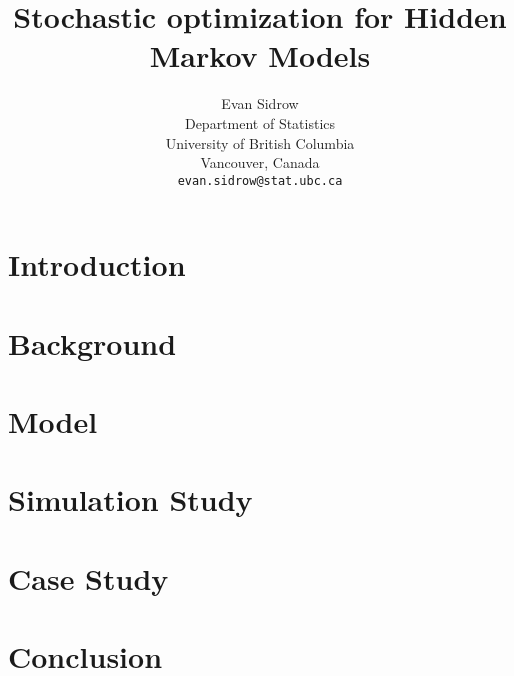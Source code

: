\documentclass{article}
\title{Stochastic optimization for Hidden Markov Models}
\author{
  Evan Sidrow \\
  Department of Statistics\\
  University of British Columbia\\
  Vancouver, Canada \\
  \texttt{evan.sidrow@stat.ubc.ca} \\
}
\begin{document}
\maketitle


\section{Introduction}
%

\section{Background}


\section{Model}


\section{Simulation Study}


\section{Case Study}


\section{Conclusion}


\newpage

\end{document}
